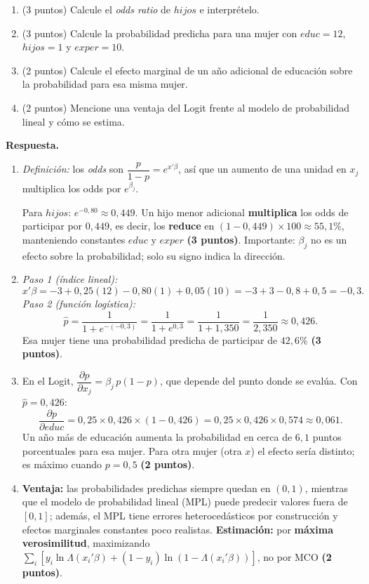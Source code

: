 \documentclass[12pt,letterpaper]{article}
\newcommand{\sol}{\color{blue}}
\begin{document}
\begin{enumerate}
\begin{enumerate}[label=\alph*)]
    \item (3 puntos) Calcule el \textit{odds ratio} de $hijos$ e interprételo.
    \item (3 puntos) Calcule la probabilidad predicha para una mujer con $educ=12$, $hijos=1$ y $exper=10$.
    \item (2 puntos) Calcule el efecto marginal de un año adicional de educación sobre la probabilidad para esa misma mujer.
    \item (2 puntos) Mencione una ventaja del Logit frente al modelo de probabilidad lineal y cómo se estima.
\end{enumerate}

{\sol
\textbf{Respuesta.}
\begin{enumerate}[label=\alph*)]
    \item \textit{Definición:} los \textit{odds} son $\dfrac{p}{1-p}=e^{x'\beta}$, así que un aumento de una unidad en $x_j$ multiplica los odds por $e^{\beta_j}$.

    Para $hijos$: $e^{-0{,}80}\approx0{,}449$. Un hijo menor adicional \textbf{multiplica} los odds de participar por $0{,}449$, es decir, los \textbf{reduce} en $(1-0{,}449)\times100\approx55{,}1\%$, manteniendo constantes $educ$ y $exper$ \textbf{(3 puntos)}. Importante: $\beta_j$ no es un efecto sobre la probabilidad; solo su signo indica la dirección.

    \item \textit{Paso 1 (índice lineal):}
    \[
        x'\beta=-3+0{,}25(12)-0{,}80(1)+0{,}05(10)=-3+3-0{,}8+0{,}5=-0{,}3 .
    \]
    \textit{Paso 2 (función logística):}
    \[
        \hat p=\frac{1}{1+e^{-(-0{,}3)}}=\frac{1}{1+e^{0{,}3}}=\frac{1}{1+1{,}350}=\frac{1}{2{,}350}\approx0{,}426 .
    \]
    Esa mujer tiene una probabilidad predicha de participar de $42{,}6\%$ \textbf{(3 puntos)}.

    \item En el Logit, $\dfrac{\partial p}{\partial x_j}=\beta_j\,p(1-p)$, que depende del punto donde se evalúa. Con $\hat p=0{,}426$:
    \[
        \frac{\partial p}{\partial educ}=0{,}25\times0{,}426\times(1-0{,}426)=0{,}25\times0{,}426\times0{,}574\approx0{,}061 .
    \]
    Un año más de educación aumenta la probabilidad en cerca de $6{,}1$ puntos porcentuales para esa mujer. Para otra mujer (otra $x$) el efecto sería distinto; es máximo cuando $p=0{,}5$ \textbf{(2 puntos)}.

    \item \textbf{Ventaja:} las probabilidades predichas siempre quedan en $(0,1)$, mientras que el modelo de probabilidad lineal (MPL) puede predecir valores fuera de $[0,1]$; además, el MPL tiene errores heterocedásticos por construcción y efectos marginales constantes poco realistas. \textbf{Estimación:} por \textbf{máxima verosimilitud}, maximizando $\sum_i\left[y_i\ln\Lambda(x_i'\beta)+(1-y_i)\ln(1-\Lambda(x_i'\beta))\right]$, no por MCO \textbf{(2 puntos)}.
\end{enumerate}}


\end{enumerate}
\end{document}

